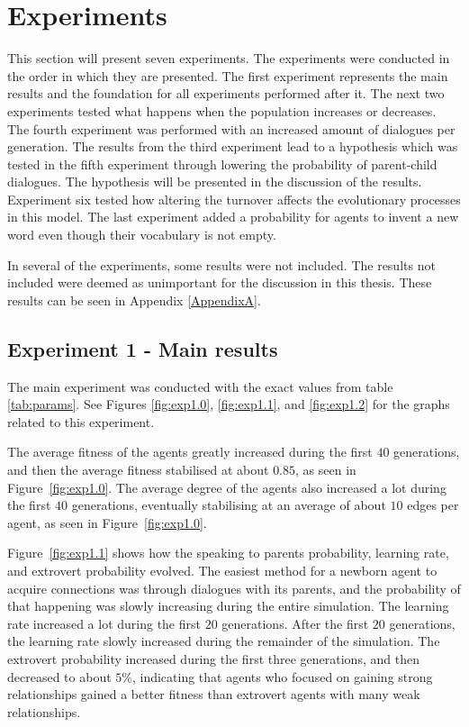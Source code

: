 \section{Experiments}
This section will present seven experiments. The experiments were conducted in the order in which they are presented. The first experiment represents the main results and the foundation for all experiments performed after it. The next two experiments tested what happens when the population increases or decreases. The fourth experiment was performed with an increased amount of dialogues per generation. The results from the third experiment lead to a hypothesis which was tested in the fifth experiment through lowering the probability of parent-child dialogues. The hypothesis will be presented in the discussion of the results. Experiment six tested how altering the turnover affects the evolutionary processes in this model. The last experiment added a probability for agents to invent a new word even though their vocabulary is not empty.

In several of the experiments, some results were not included. The results not included were deemed as unimportant for the discussion in this thesis. These results can be seen in Appendix \ref{AppendixA}.

\subsection{Experiment 1 - Main results}
The main experiment was conducted with the exact values from table \ref{tab:params}. See Figures \ref{fig:exp1.0}, \ref{fig:exp1.1}, and \ref{fig:exp1.2} for the graphs related to this experiment.

The average fitness of the agents greatly increased during the first $40$ generations, and then the average fitness stabilised at about $0.85$, as seen in Figure~\ref{fig:exp1.0}. The average degree of the agents also increased a lot during the first $40$ generations, eventually stabilising at an average of about $10$ edges per agent, as seen in Figure~\ref{fig:exp1.0}. 

Figure~\ref{fig:exp1.1} shows how the speaking to parents probability, learning rate, and extrovert probability evolved. The easiest method for a newborn agent to acquire connections was through dialogues with its parents, and the probability of that happening was slowly increasing during the entire simulation. The learning rate increased a lot during the first $20$ generations. After the first $20$ generations, the learning rate slowly increased during the remainder of the simulation. The extrovert probability increased during the first three generations, and then decreased to about $5\%$, indicating that agents who focused on gaining strong relationships gained a better fitness than extrovert agents with many weak relationships.  

